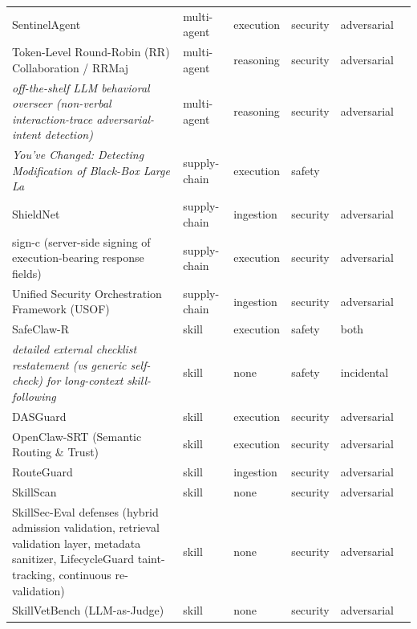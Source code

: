 \begin{longtable}{@{}>{\raggedright\arraybackslash}p{}lllll@{}}
SentinelAgent & multi-agent & execution & security & adversarial & \cite{he-2025-sentinelagent} \\
Token-Level Round-Robin (RR) Collaboration / RRMaj & multi-agent & reasoning & security & adversarial & \cite{liu-2026-consensus} \\
\emph{off-the-shelf LLM behavioral overseer (non-verbal interaction-trace adversarial-intent detection)} & multi-agent & reasoning & security & adversarial & \cite{musaffar-2026-detection} \\
\emph{You've Changed: Detecting Modification of Black-Box Large La} & supply-chain & execution & safety &  & \cite{dima-2025-you} \\
ShieldNet & supply-chain & ingestion & security & adversarial & \cite{yuan-2026-shieldnet} \\
sign-c (server-side signing of execution-bearing response fields) & supply-chain & execution & security & adversarial & \cite{luo-2026-rewriting} \\
Unified Security Orchestration Framework (USOF) & supply-chain & ingestion & security & adversarial & \cite{muthu-2026-unified} \\
SafeClaw-R & skill & execution & safety & both & \cite{wang-2026-safeclawr} \\
\emph{detailed external checklist restatement (vs generic self-check) for long-context skill-following} & skill & none & safety & incidental & \cite{xue-2026-agent} \\
DASGuard & skill & execution & security & adversarial & \cite{tan-2026-prompt} \\
OpenClaw-SRT (Semantic Routing \& Trust) & skill & execution & security & adversarial & \cite{chen-2026-openclawsrt} \\
RouteGuard & skill & ingestion & security & adversarial & \cite{xiao-2026-routeguard} \\
SkillScan & skill & none & security & adversarial & \cite{liu-2026-agentb} \\
SkillSec-Eval defenses (hybrid admission validation, retrieval validation layer, metadata sanitizer, LifecycleGuard taint-tracking, continuous re-validation) & skill & none & security & adversarial & \cite{badhe-2026-agent} \\
SkillVetBench (LLM-as-Judge) & skill & none & security & adversarial & \cite{hossain-2026-skillvetbench} \\
\end{longtable}
\endgroup

